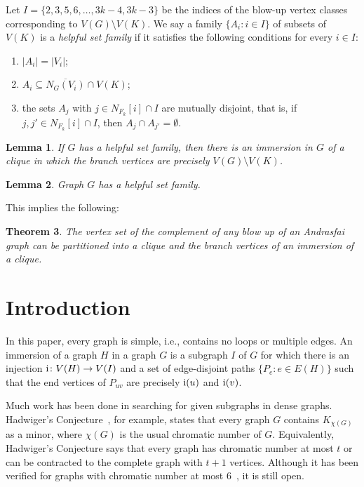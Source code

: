 \documentclass[a4paper,12pt]{article}
\newtheorem{theorem}{Theorem}
\newtheorem{lemma}[theorem]{Lemma}
\newcommand{\ifun}{{\rm i}}
\begin{document}
Let \(I = \{2,3,5,6,\ldots,3k-4,3k-3\}\) be the indices of the blow-up vertex classes
corresponding to \(V(G)\setminus V(K)\).
We say a family \(\{A_i: i \in I\}\) of subsets of \(V(K)\) is a \emph{helpful set family} 
if it satisfies the following conditions for every \(i \in I\):
\begin{enumerate}
\item \(|A_i| = |V_i|\);
\item \(A_i \subseteq \overline{N_G(V_i)} \cap V(K)\);
\item the sets \(A_j\) with \(j \in N_{F_k}[i]\cap I\) are mutually disjoint, 
  that is, if \(j,j' \in N_{F_k}[i] \cap I\), then \(A_j\cap A_{j'} = \emptyset\).
\end{enumerate}

\begin{lemma}
  If \(G\) has a helpful set family, then there is an immersion in \(G\) of 
  a clique in which the branch vertices are precisely \(V(G)\setminus V(K)\).
\end{lemma}

\begin{lemma}
  Graph \(G\) has a helpful set family. 
\end{lemma}

This implies the following: 

\begin{theorem}
 The vertex set of the complement of any blow up of an Andrasfai graph can be partitioned 
 into a clique and the branch vertices of an immersion of a clique. 
\end{theorem}

\section{Introduction}

In this paper, every graph is simple, i.e., contains no loops or multiple edges.
An immersion of a graph \(H\) in a graph \(G\)
is a subgraph \(I\) of \(G\) for which there is an injection \(\ifun \colon V(H) \to V(I)\)
and a set of edge-disjoint paths \(\{P_e : e \in E(H)\}\) 
such that the end vertices of \(P_{uv}\) are precisely \(\ifun(u)\) and \(\ifun(v)\).

Much work has been done in searching for given subgraphs in dense graphs.
Hadwiger's Conjecture~\cite{hadwiger1943klassifikation}, for example,
states that every graph \(G\) contains \(K_{\chi(G)}\) as a minor,
where \(\chi(G)\) is the usual chromatic number of \(G\).
Equivalently, Hadwiger's Conjecture says that every graph has chromatic number at most \(t\)
or can be contracted to the complete graph with \(t+1\) vertices.
Although it has been verified for graphs with chromatic number at most \(6\)~\cite{robertson1993hadwiger}, it is still open.
\end{document}
